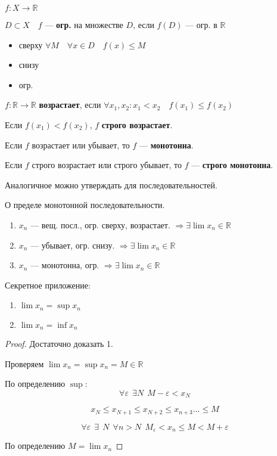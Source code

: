 \begin{definition}
    $f:X\to \mathbb{R}$

    $D\subset X \quad f$ --- \textbf{огр.} на множестве $D$, если $f(D)$ --- огр. в $\mathbb{R}$
    \begin{itemize}
        \itemsep0em
        \item сверху $\forall M \quad \forall x\in D \quad f(x)\leq M$
        \item снизу
        \item огр.
    \end{itemize}
\end{definition}

\begin{definition}
    $f:\mathbb{R}\to \mathbb{R}$ \textbf{возрастает}, если $\forall x_1, x_2: x_1<x_2 \quad f(x_1)\leq f(x_2)$

    Если $f(x_1)<f(x_2)$, $f$ \textbf{строго возрастает}.

    Если $f$ возрастает или убывает, то $f$ --- \textbf{монотонна}.

    Если $f$ строго возрастает или строго убывает, то $f$ --- \textbf{строго монотонна}.

    Аналогичное можно утверждать для последовательностей.
\end{definition}

\begin{theorem}
    О пределе монотонной последовательности.
    \begin{enumerate}
        \item $x_n$ --- вещ. посл., огр. сверху, возрастает. $\Rightarrow \exists\lim x_n\in\mathbb{R}$
        \item $x_n$ --- убывает, огр. снизу. $\Rightarrow \exists \lim x_n\in\mathbb{R}$
        \item $x_n$ --- монотонна, огр. $\Rightarrow \exists \lim x_n\in\mathbb{R}$
    \end{enumerate}

    Секретное приложение:
    \begin{enumerate}
        \item $\lim x_n=\sup x_n$
        \item $\lim x_n=\inf x_n$
    \end{enumerate}
\end{theorem}

\begin{proof}
    Достаточно доказать 1.

    Проверяем $\lim x_n=\sup x_n=M\in\mathbb{R}$

    По определению $\sup$: $$\forall \varepsilon \ \ \exists N \ \ M-\varepsilon<x_N$$

    $$x_N\leq x_{N+1}\leq x_{N+2}\leq x_{n+3}\ldots \leq M$$

    $$\forall \varepsilon \ \ \exists \ \ N \ \ \forall n>N \ \ M_\varepsilon<x_n\leq M<M+\varepsilon$$

    По определению $M=\lim x_n$
\end{proof}

